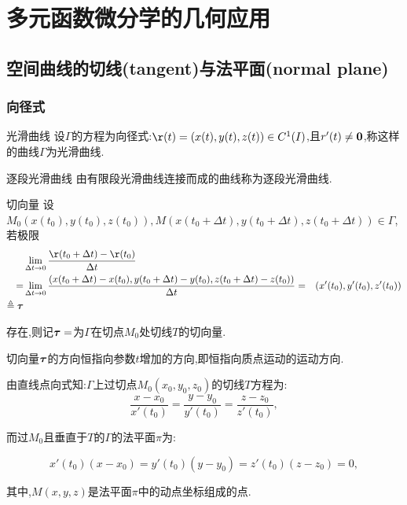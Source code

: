 \setcounter{chapter}{11} %

\chapter{多元函数微分学的几何应用}

\section{空间曲线的切线(tangent)与法平面(normal plane)}
\subsection{向径式}
\begin{definition}{光滑曲线}
    设$\Gamma$的方程为向径式:$\r(t)=(x(t),y(t),z(t))\in C^1(I)$,且$r'(t)\neq \bm{0}$,称这样的曲线$\Gamma$为光滑曲线.
\end{definition}
\begin{definition}{逐段光滑曲线}
    由有限段光滑曲线连接而成的曲线称为逐段光滑曲线.
\end{definition}
\begin{definition}{切向量}
    设$M_0(x(t_0),y(t_0),z(t_0)),M(x(t_0+\Delta t),y(t_0+\Delta t),z(t_0+\Delta t))\in\Gamma$,若极限
    \begin{align*}
        &\lim_{\Delta t\to0}\frac{\r(t_0+\Delta t)-\r(t_0)}{\Delta t}\\
        =&\lim_{\Delta t\to 0}\frac{(x(t_0+\Delta t)-x(t_0),y(t_0+\Delta t)-y(t_0),z(t_0+\Delta t)-z(t_0))}{\Delta t}
        =&(x'(t_0),y'(t_0),z'(t_0))\\
        \triangleq \btau
    \end{align*}
    
    存在,则记$\bm{\tau}=$为$\Gamma$在切点$M_0$处切线$T$的切向量.
\end{definition}
\begin{remark}
    切向量$\bm{\tau}$的方向恒指向参数$t$增加的方向,即恒指向质点运动的运动方向.
\end{remark}
    由直线点向式知:$\Gamma$上过切点$M_0(x_0,y_0,z_0)$的切线$T$方程为:
    $$\frac{x-x_0}{x'(t_0)}=\frac{y-y_0}{y'(t_0)}=\frac{z-z_0}{z'(t_0)},$$

    而过$M_0$且垂直于$T$的$\Gamma$的法平面$\pi$为:

    $$x'(t_0)(x-x_0)=y'(t_0)(y-y_0)=z'(t_0)(z-z_0)=0,$$

    其中,$M(x,y,z)$是法平面$\pi$中的动点坐标组成的点.

